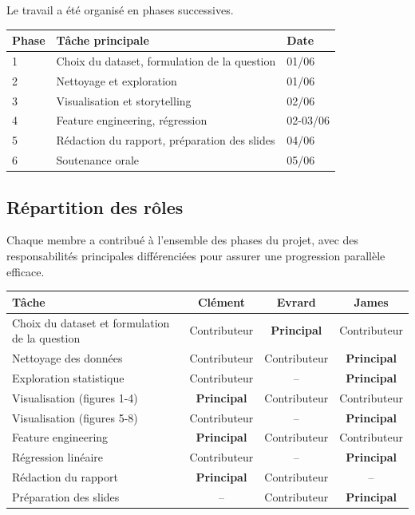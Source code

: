 \documentclass[12pt,a4paper]{article}
\begin{document}
Le travail a été organisé en phases successives.

\begin{center}
\begin{tabular}{@{}lll@{}}
\toprule
\rowcolor{coffeecream}
\textbf{Phase} & \textbf{Tâche principale} & \textbf{Date} \\
\midrule
1 & Choix du dataset, formulation de la question & 01/06 \\
2 & Nettoyage et exploration & 01/06 \\
3 & Visualisation et storytelling & 02/06 \\
4 & Feature engineering, régression & 02-03/06 \\
5 & Rédaction du rapport, préparation des slides & 04/06 \\
6 & Soutenance orale & 05/06 \\
\bottomrule
\end{tabular}
\end{center}

\subsection{Répartition des rôles}
 
Chaque membre a contribué à l'ensemble des phases du projet, avec des responsabilités principales
différenciées pour assurer une progression parallèle efficace.
 
\begin{center}
\begin{tabular}{@{}lccc@{}}
\toprule
\rowcolor{coffeecream}
\textbf{Tâche} & \textbf{Clément} & \textbf{Evrard} & \textbf{James} \\
\midrule
Choix du dataset et formulation de la question  & Contributeur & \textbf{Principal} & Contributeur \\
Nettoyage des données              & Contributeur & Contributeur & \textbf{Principal} \\
Exploration statistique                   & Contributeur & -- & \textbf{Principal} \\
Visualisation (figures 1-4)                    & \textbf{Principal} & Contributeur & Contributeur \\
Visualisation (figures 5-8)                    & Contributeur & -- & \textbf{Principal} \\
Feature engineering                             & \textbf{Principal} & Contributeur & Contributeur \\
Régression linéaire                             & Contributeur & -- & \textbf{Principal} \\
Rédaction du rapport                            & \textbf{Principal} & Contributeur & -- \\
Préparation des slides                          & -- & Contributeur & \textbf{Principal} \\
\bottomrule
\end{tabular}
\end{center}
\end{document}

